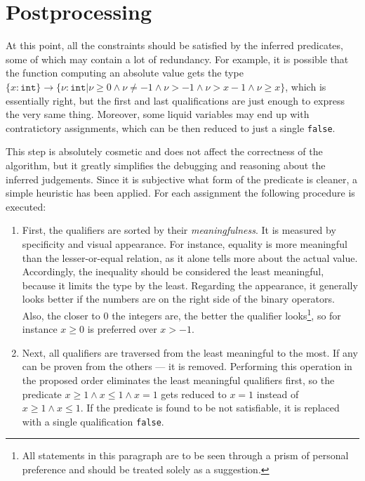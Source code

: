 \section{Postprocessing}

At this point, all the constraints should be satisfied by the inferred
predicates, some of which may contain a lot of redundancy. For example, it is
possible that the function computing an absolute value gets the type $\{x :
\texttt{int}\} \to \{\nu : \texttt{int} | \nu \geq 0 \land \nu \neq -1 \land \nu
> -1 \land \nu > x - 1 \land \nu \geq x\}$, which is essentially right, but the
first and last qualifications are just enough to express the very same thing.
Moreover, some liquid variables may end up with contratictory assignments, which
can be then reduced to just a single \texttt{false}.

This step is absolutely cosmetic and does not affect the correctness of the
algorithm, but it greatly simplifies the debugging and reasoning about the
inferred judgements. Since it is subjective what form of the predicate is
cleaner, a simple heuristic has been applied. For each assignment the following
procedure is executed:

\begin{enumerate}
\item First, the qualifiers are sorted by their \emph{meaningfulness}. It is
  measured by specificity and visual appearance. For instance, equality is more
  meaningful than the lesser-or-equal relation, as it alone tells more about the
  actual value. Accordingly, the inequality should be considered the least
  meaningful, because it limits the type by the least. Regarding the appearance,
  it generally looks better if the numbers are on the right side of the binary
  operators. Also, the closer to 0 the integers are, the better the qualifier
  looks\footnote{All statements in this paragraph are to be seen through a prism
    of personal preference and should be treated solely as a suggestion.}, so
  for instance $x \geq 0$ is preferred over $x > -1$.

\item Next, all qualifiers are traversed from the least meaningful to the most.
  If any can be proven from the others --- it is removed. Performing this
  operation in the proposed order eliminates the least meaningful qualifiers
  first, so the predicate $x \geq 1 \land x \leq 1 \land x = 1$ gets reduced to
  $x = 1$ instead of $x \geq 1 \land x \leq 1$. If the predicate is found to be
  not satisfiable, it is replaced with a single qualification \texttt{false}.
\end{enumerate}
